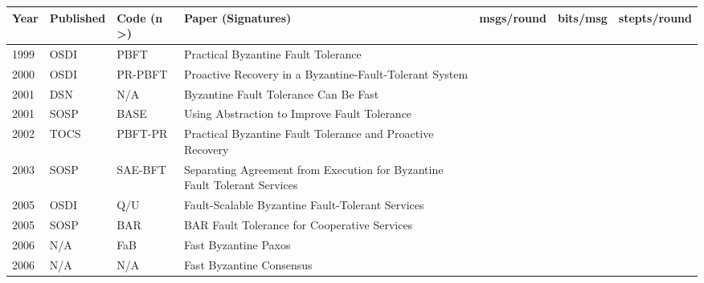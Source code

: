 \documentclass{article}
\begin{document}
\begin{landscape}
\begin{longtable}[c]{llll|l|l|l|}
\hline
Year & Published         & Code (n \textgreater{}) & Paper (Signatures)                                                                        & msgs/round & bits/msg & stepts/round \\ \hline
\endfirsthead
%
\endhead
%
1999 & OSDI              & PBFT                    & Practical Byzantine Fault Tolerance                                                       &            &          &              \\ \cline{5-7} 
2000 & OSDI              & PR-PBFT                 & Proactive Recovery in a Byzantine-Fault-Tolerant System                                   &            &          &              \\ \cline{5-7} 
2001 & DSN               & N/A                     & Byzantine Fault Tolerance Can Be Fast                                                     &            &          &              \\ \cline{5-7} 
2001 & SOSP              & BASE                    & Using Abstraction to Improve Fault Tolerance                                              &            &          &              \\ \cline{5-7} 
2002 & TOCS              & PBFT-PR                 & Practical Byzantine Fault Tolerance and Proactive Recovery                                &            &          &              \\ \cline{5-7} 
2003 & SOSP              & SAE-BFT                 & Separating Agreement from Execution for Byzantine Fault Tolerant Services                 &            &          &              \\ \cline{5-7} 
2005 & OSDI              & Q/U                     & Fault-Scalable Byzantine Fault-Tolerant Services                                          &            &          &              \\ \cline{5-7} 
2005 & SOSP              & BAR                     & BAR Fault Tolerance for Cooperative Services                                              &            &          &              \\ \cline{5-7} 
2006 & N/A               & FaB                     & Fast Byzantine Paxos                                                                      &            &          &              \\ \cline{5-7} 
2006 & N/A               & N/A                     & Fast Byzantine Consensus                                                                  &            &          &              \\ \cline{5-7} 

\end{longtable}
\end{landscape}
\end{document}
